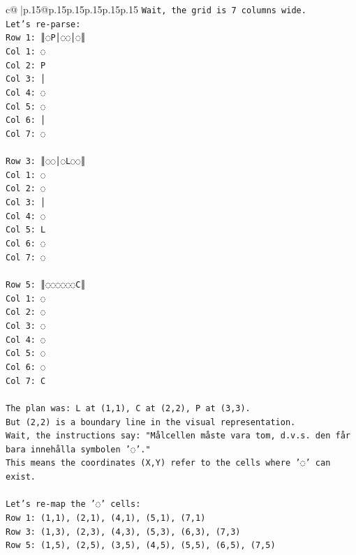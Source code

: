 \documentclass{article}
\begin{document}
{\begin{supertabular}{c@{$\;$}|p{.15\linewidth}@{}p{.15\linewidth}p{.15\linewidth}p{.15\linewidth}p{.15\linewidth}p{.15\linewidth}}
{{{\texttt{Wait, the grid is 7 columns wide.} \\
\texttt{Let's re{-}parse:} \\
\texttt{Row 1: ║◌P│◌◌│◌║} \\
\texttt{Col 1: ◌} \\
\texttt{Col 2: P} \\
\texttt{Col 3: │} \\
\texttt{Col 4: ◌} \\
\texttt{Col 5: ◌} \\
\texttt{Col 6: │} \\
\texttt{Col 7: ◌} \\
\\ 
\texttt{Row 3: ║◌◌│◌L◌◌║} \\
\texttt{Col 1: ◌} \\
\texttt{Col 2: ◌} \\
\texttt{Col 3: │} \\
\texttt{Col 4: ◌} \\
\texttt{Col 5: L} \\
\texttt{Col 6: ◌} \\
\texttt{Col 7: ◌} \\
\\ 
\texttt{Row 5: ║◌◌◌◌◌◌C║} \\
\texttt{Col 1: ◌} \\
\texttt{Col 2: ◌} \\
\texttt{Col 3: ◌} \\
\texttt{Col 4: ◌} \\
\texttt{Col 5: ◌} \\
\texttt{Col 6: ◌} \\
\texttt{Col 7: C} \\
\\ 
\texttt{The plan was: L at (1,1), C at (2,2), P at (3,3).} \\
\texttt{But (2,2) is a boundary line in the visual representation.} \\
\texttt{Wait, the instructions say: "Målcellen måste vara tom, d.v.s. den får bara innehålla symbolen '◌'."} \\
\texttt{This means the coordinates (X,Y) refer to the cells where '◌' can exist.} \\
\\ 
\texttt{Let's re{-}map the '◌' cells:} \\
\texttt{Row 1: (1,1), (2,1), (4,1), (5,1), (7,1)} \\
\texttt{Row 3: (1,3), (2,3), (4,3), (5,3), (6,3), (7,3)} \\
\texttt{Row 5: (1,5), (2,5), (3,5), (4,5), (5,5), (6,5), (7,5)} \\
}}}
\end{supertabular}}
\end{document}
